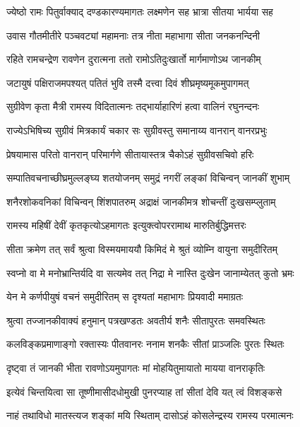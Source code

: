 \twolineshloka
{ज्येष्ठो रामः पितुर्वाक्याद् दण्डकारण्यमागतः}
{लक्ष्मणेन सह भ्रात्रा सीतया भार्यया सह} %

\twolineshloka
{उवास गौतमीतीरे पञ्चवट्यां महामनाः}
{तत्र नीता महाभागा सीता जनकनन्दिनी} %

\twolineshloka
{रहिते रामचन्द्रेण रावणेन दुरात्मना}
{ततो रामोऽतिदुःखार्तो मार्गमाणोऽथ जानकीम्} %

\twolineshloka
{जटायुषं पक्षिराजमपश्यत् पतितं भुवि}
{तस्मै दत्त्वा दिवं शीघ्रमृष्यमूकमुपागमत्} %

\twolineshloka
{सुग्रीवेण कृता मैत्री रामस्य विदितात्मनः}
{तद्भार्याहारिणं हत्वा वालिनं रघुनन्दनः} %

\twolineshloka
{राज्येऽभिषिच्य सुग्रीवं मित्रकार्यं चकार सः}
{सुग्रीवस्तु समानाय्य वानरान् वानरप्रभुः} %

\twolineshloka
{प्रेषयामास परितो वानरान् परिमार्गणे}
{सीतायास्तत्र चैकोऽहं सुग्रीवसचिवो हरिः} %

\twolineshloka
{सम्पातिवचनाच्छीघ्रमुल्लङ्घ्य शतयोजनम्}
{समुद्रं नगरीं लङ्कां विचिन्वन् जानकीं शुभाम्} %

\twolineshloka
{शनैरशोकवनिकां विचिन्वन् शिंशपातरुम्}
{अद्राक्षं जानकीमत्र शोचन्तीं दुःखसम्प्लुताम्} %

\twolineshloka
{रामस्य महिषीं देवीं कृतकृत्योऽहमागतः}
{इत्युक्त्वोपररामाथ मारुतिर्बुद्धिमत्तरः} %

\twolineshloka
{सीता क्रमेण तत् सर्वं श्रुत्वा विस्मयमाययौ}
{किमिदं मे श्रुतं व्योम्नि वायुना समुदीरितम्} %

\twolineshloka
{स्वप्नो वा मे मनोभ्रान्तिर्यदि वा सत्यमेव तत्}
{निद्रा मे नास्ति दुःखेन जानाम्येतत् कुतो भ्रमः} %

\twolineshloka
{येन मे कर्णपीयुषं वचनं समुदीरितम्}
{स दृश्यतां महाभागः प्रियवादी ममाग्रतः} %

\twolineshloka
{श्रुत्वा तज्जानकीवाक्यं हनुमान् पत्रखण्डतः}
{अवतीर्य शनैः सीतापुरतः समवस्थितः} %

\twolineshloka
{कलविङ्कप्रमाणाङ्गो रक्तास्यः पीतवानरः}
{ननाम शनकैः सीतां प्राञ्जलिः पुरतः स्थितः} %

\twolineshloka
{दृष्ट्वा तं जानकी भीता रावणोऽयमुपागतः}
{मां मोहयितुमायातो मायया वानराकृतिः} %

\twolineshloka
{इत्येवं चिन्तयित्वा सा तूष्णीमासीदधोमुखी}
{पुनरप्याह तां सीतां देवि यत् त्वं विशङ्कसे} %

\twolineshloka
{नाहं तथाविधो मातस्त्यज शङ्कां मयि स्थिताम्}
{दासोऽहं कोसलेन्द्रस्य रामस्य परमात्मनः} %

